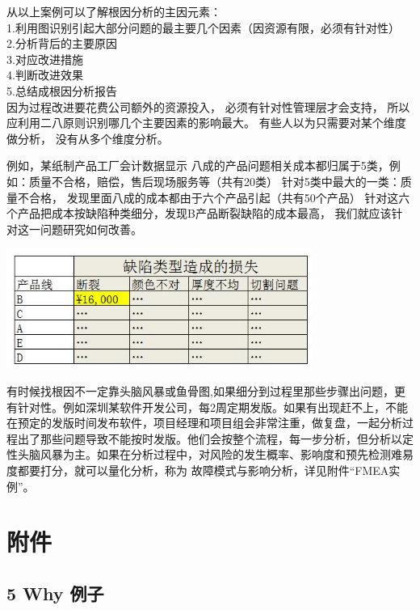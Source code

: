 从以上案例可以了解根因分析的主因元素：\\
1.利用图识别引起大部分问题的最主要几个因素（因资源有限，必须有针对性）\\
2.分析背后的主要原因\\
3.对应改进措施\\
4.判断改进效果\\
5.总结成根因分析报告\\
因为过程改进要花费公司额外的资源投入， 必须有针对性管理层才会支持，
所以应利用二八原则识别哪几个主要因素的影响最大。
有些人以为只需要对某个维度做分析， 没有从多个维度分析。

例如，某纸制产品工厂会计数据显示
八成的产品问题相关成本都归属于5类，例如：质量不合格，赔偿，售后现场服务等（共有20类）
针对5类中最大的一类：质量不合格，
发现里面八成的成本都由于六个产品引起（共有50个产品）
针对这六个产品把成本按缺陷种类细分，发现B产品断裂缺陷的成本最高，
我们就应该针对这一问题研究如何改善。


\includegraphics[width=10cm]{Ar2_缺陷类型造成的损失.jpg}

有时候找根因不一定靠头脑风暴或鱼骨图,如果细分到过程里那些步骤出问题，更有针对性。例如深圳某软件开发公司，每2周定期发版。如果有出现赶不上，不能在预定的发版时间发布软件，项目经理和项目组会非常注重，做复盘，一起分析过程出了那些问题导致不能按时发版。他们会按整个流程，每一步分析，但分析以定性头脑风暴为主。如果在分析过程中，对风险的发生概率、影响度和预先检测难易度都要打分，就可以量化分析，称为
故障模式与影响分析，详见附件``FMEA实例''。

\hypertarget{ux9644ux4ef6}{%
\section{附件}\label{ux9644ux4ef6}}

\hypertarget{why-ux4f8bux5b50}{%
\subsection{5 Why 例子}\label{why-ux4f8bux5b50}}

